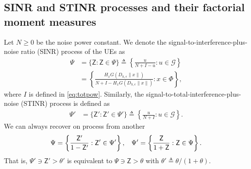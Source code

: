 \documentclass[lettersize,journal]{IEEEtran}
\begin{document}
\subsection{SINR and STINR processes and their factorial moment measures}
Let $N \geq 0$ be the noise power constant. We denote the signal-to-interference-plus-noise ratio (SINR) process of the UEs as
\begin{align}
  \label{eq:STIR}
  \Psi &= \{\mathsf{Z}: \mathsf{Z} \in \Psi\} \triangleq \left\{ \frac{u}{N+I-u} : u \in \mathcal{G}\right\} \\
  &=\left\{ \frac{H_x G(D_{h,\epsilon}\|x\|)}{N+I-H_x G(D_{h,\epsilon}\|x\|)} : x \in \Phi\right\},
\end{align}
where $I$ is defined in \eqref{eq:totpow}. Similarly, the signal-to-total-interference-plus-noise (STINR) process is defined as
\begin{align}
  \label{eq:STINR}
  \Psi' &= \{\mathsf{Z}': \mathsf{Z}' \in \Psi'\} \triangleq \left\{ \frac{u}{N+I} : u \in \mathcal{G}\right\}.
\end{align}
We can always recover on process from another
\begin{equation}
  \Psi = \left\{ \frac{\mathsf{Z}'}{1- \mathsf{Z}'}: \mathsf{Z}' \in \Psi' \right\}, \hspace{0.3cm} \Psi' = \left\{ \frac{\mathsf{Z}}{1+ \mathsf{Z}}: \mathsf{Z} \in \Psi \right\}.
\end{equation}
That is, $\Psi' \ni \mathsf{Z}'> \theta'$ is equivalent to $\Psi \ni\mathsf{Z}> \theta$ with $\theta' \triangleq \theta/(1+\theta)$.
\end{document}
